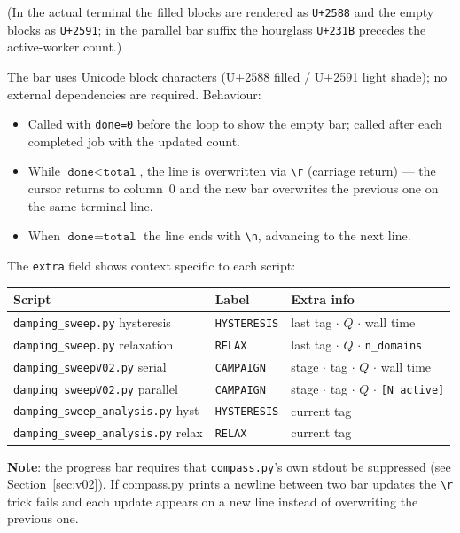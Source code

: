 \documentclass[11pt,a4paper]{article}
\newcommand{\file}[1]{\texttt{#1}}
\newcommand{\warn}[1]{\textcolor{warnorange}{\textbf{#1}}}
\begin{document}
\noindent (In the actual terminal the filled blocks are rendered as \texttt{U+2588} and the
empty blocks as \texttt{U+2591}; in the parallel bar suffix the hourglass \texttt{U+231B}
precedes the active-worker count.)

\noindent The bar uses Unicode block characters (U+2588 filled / U+2591 light shade);
no external dependencies are required.  Behaviour:
\begin{itemize}
  \item Called with \texttt{done=0} before the loop to show the empty bar;
    called after each completed job with the updated count.
  \item While $\texttt{done} < \texttt{total}$, the line is overwritten
    via \texttt{\textbackslash r} (carriage return) --- the cursor returns
    to column~0 and the new bar overwrites the previous one on the same
    terminal line.
  \item When $\texttt{done} = \texttt{total}$ the line ends with
    \texttt{\textbackslash n}, advancing to the next line.
\end{itemize}

\noindent The \texttt{extra} field shows context specific to each script:

\begin{center}
\begin{tabular}{lll}
\toprule
Script & Label & Extra info \\
\midrule
\file{damping\_sweep.py} hysteresis & \texttt{HYSTERESIS} & last tag $\cdot$ $Q$ $\cdot$ wall time \\
\file{damping\_sweep.py} relaxation & \texttt{RELAX} & last tag $\cdot$ $Q$ $\cdot$ \texttt{n\_domains} \\
\file{damping\_sweepV02.py} serial & \texttt{CAMPAIGN} & stage $\cdot$ tag $\cdot$ $Q$ $\cdot$ wall time \\
\file{damping\_sweepV02.py} parallel & \texttt{CAMPAIGN} & stage $\cdot$ tag $\cdot$ $Q$ $\cdot$ \texttt{[N active]} \\
\file{damping\_sweep\_analysis.py} hyst & \texttt{HYSTERESIS} & current tag \\
\file{damping\_sweep\_analysis.py} relax & \texttt{RELAX} & current tag \\
\bottomrule
\end{tabular}
\end{center}

\warn{Note}: the progress bar requires that \texttt{compass.py}'s own stdout
be suppressed (see Section~\ref{sec:v02}).  If compass.py prints
a newline between two bar updates the \texttt{\textbackslash r} trick fails
and each update appears on a new line instead of overwriting the previous one.
\end{document}
